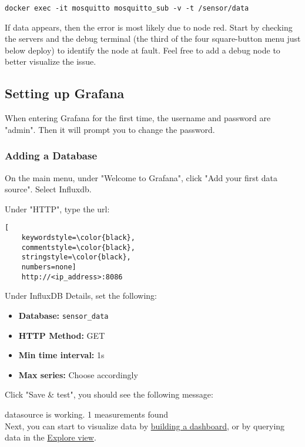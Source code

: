 \documentclass[onecolumn]{article}
\begin{document}
\begin{lstlisting}[numbers=none]
    docker exec -it mosquitto mosquitto_sub -v -t /sensor/data
\end{lstlisting}

If data appears, then the error is most likely due to node red. Start by checking the servers and the debug terminal (the third of the four square-button menu just below deploy) to identify the node at fault. Feel free to add a debug node to better visualize the issue.


\subsection{Setting up Grafana}
When entering Grafana for the first time, the username and password are "admin". Then it will prompt you to change the password. 

\subsubsection{Adding a Database}
On the main menu, under "Welcome to Grafana", click "Add your first data source". Select Influxdb.

Under "HTTP", type the url:

\begin{lstlisting}[
    keywordstyle=\color{black},
    commentstyle=\color{black},
    stringstyle=\color{black},
    numbers=none]
    http://<ip_address>:8086
\end{lstlisting}

Under InfluxDB Details, set the following:

\begin{itemize}
    \item \textbf{Database:} \texttt{sensor\_data}
    \item \textbf{HTTP Method:} GET
    \item \textbf{Min time interval:} 1s
    \item \textbf{Max series:} Choose accordingly
\end{itemize}

Click "Save \& test", you should see the following message:

\begin{tcolorbox}[colback=white,colframe=black!100, arc=0mm, boxrule=0.4pt]
     datasource is working. 1 measurements found \\
Next, you can start to visualize data by \underline{building a dashboard}, or by querying data in the \underline{Explore view}.
\end{tcolorbox}
\end{document}
